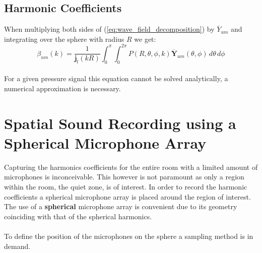 \subsection{Harmonic Coefficients}
When multiplying both sides of (\ref{eq:wave_field_decomposition}) by $\overline Y_{um}$ and integrating over the sphere with radius $R$ we get\cite{Chen2017}:\\
\begin{equation}
    {\beta_{um}(k) = \frac{1}{\mathbf j_l(kR)}\int_0^\pi\int_0^{2\pi}P(R,\theta,\phi,k) \overline {\mathbf{Y}}_{um}(\theta,\phi)\,d\theta\, d\phi}
    \label{eq:harmonic_coefficients}
\end{equation}\\
For a given pressure signal this equation cannot be solved analytically, a numerical approximation is necessary.
\newpage
\section{Spatial Sound Recording using a Spherical Microphone Array}\label{sec:sampling}
Capturing the harmonics coefficients for the entire room with a limited amount of microphones is inconceivable. This however is not paramount as only a region within the room, the quiet zone, is of interest. In order to record the harmonic coefficients a spherical microphone array is placed around the region of interest. The use of a \textbf{spherical} microphone array is convenient due to its geometry coinciding with that of the spherical harmonics\cite{Chen2017}.\\\\
To define the position of the microphones on the sphere a sampling method is in demand.

